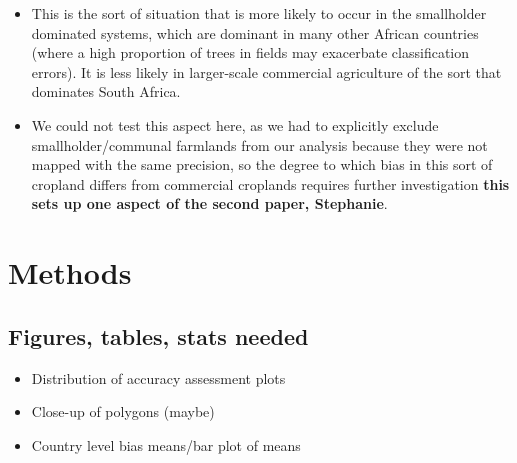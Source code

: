 \documentclass[11 pt]{article}
\begin{document}
\begin{enumerate}
\begin{itemize}
\begin{itemize}
        \item This is the sort of situation that is more likely to occur in the smallholder dominated systems, which are dominant in many other African countries (where a high proportion of trees in fields may exacerbate classification errors). It is less likely in larger-scale commercial agriculture of the sort that dominates South Africa. 
        \item We could not test this aspect here, as we had to explicitly exclude smallholder/communal farmlands from our analysis because they were not mapped with the same precision, so the degree to which bias in this sort of cropland differs from commercial croplands requires further investigation \textbf{this sets up one aspect of the second paper, Stephanie}.  
      \end{itemize}
  \end{itemize}
  
\end{enumerate}

\section*{Methods}
\subsection*{Figures, tables, stats needed}
\begin{itemize}
  \item Distribution of accuracy assessment plots
  \item Close-up of polygons (maybe)
  \item Country level bias means/bar plot of means
\end{itemize}
\end{document}
